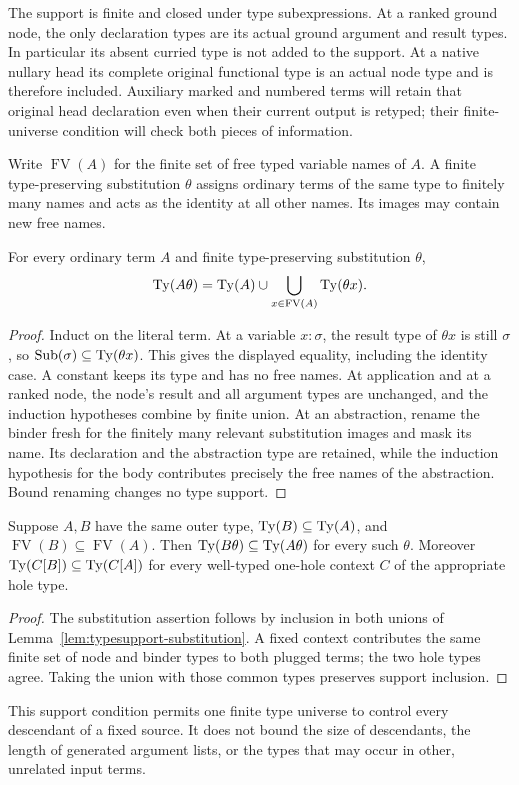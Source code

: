 The support is finite and closed under type subexpressions.  At a ranked
ground node, the only declaration types are its actual ground argument
and result types.  In particular its absent curried type is not added to
the support.  At a native nullary head its complete original functional
type is an actual node type and is therefore included.  Auxiliary marked
and numbered terms will retain that original head declaration even when
their current output is retyped; their finite-universe condition will
check both pieces of information.

Write $\operatorname{FV}(A)$ for the finite set of free typed variable
names of $A$.  A finite type-preserving substitution $\theta$ assigns
ordinary terms of the same type to finitely many names and acts as the
identity at all other names.  Its images may contain new free names.

\begin{lemma}
\label{lem:typesupport-substitution}
For every ordinary term $A$ and finite type-preserving substitution $\theta$,
\[
 \operatorname{Ty}(A\theta)=\operatorname{Ty}(A)\cup
       \bigcup_{x\in\operatorname{FV}(A)}\operatorname{Ty}(\theta x).
\]
\end{lemma}
\begin{proof}
Induct on the literal term.  At a variable $x:\sigma$, the result type of
$\theta x$ is still $\sigma$, so
$\operatorname{Sub}(\sigma)\subseteq\operatorname{Ty}(\theta x)$.  This gives the
displayed equality, including the identity case.  A constant keeps its
type and has no free names.  At application and at a ranked node, the
node's result and all argument types are unchanged, and the induction
hypotheses combine by finite union.  At an abstraction, rename the binder
fresh for the finitely many relevant substitution images and mask its
name.  Its declaration and the abstraction type are retained, while
the induction hypothesis for the body contributes precisely the free
names of the abstraction.  Bound renaming changes no type support.
\end{proof}

\begin{corollary}
\label{cor:typesupport-stability}
Suppose $A,B$ have the same outer type,
$\operatorname{Ty}(B)\subseteq\operatorname{Ty}(A)$, and
$\operatorname{FV}(B)\subseteq\operatorname{FV}(A)$.
Then $\operatorname{Ty}(B\theta)\subseteq\operatorname{Ty}(A\theta)$ for every such $\theta$.
Moreover $\operatorname{Ty}(C[B])\subseteq\operatorname{Ty}(C[A])$ for every well-typed one-hole
context $C$ of the appropriate hole type.
\end{corollary}
\begin{proof}
The substitution assertion follows by inclusion in both unions of
Lemma~\ref{lem:typesupport-substitution}.  A fixed context contributes
the same finite set of node and binder types to both plugged terms;
the two hole types agree.  Taking the union with those common types
preserves support inclusion.
\end{proof}

This support condition permits one finite type universe to control every
descendant of a fixed source.  It does not bound the size of descendants,
the length of generated argument lists, or the types that may occur in
other, unrelated input terms.
